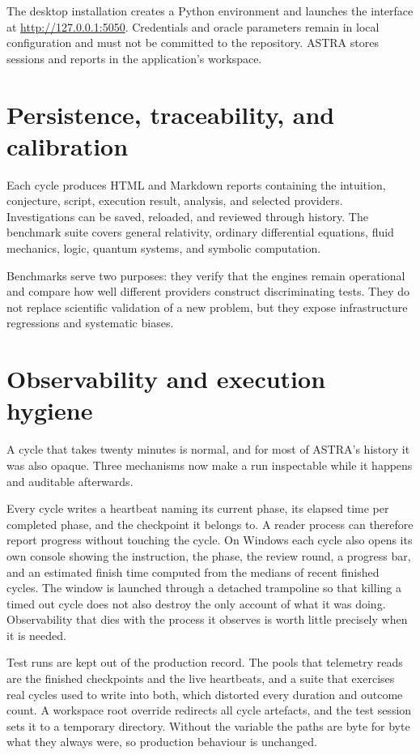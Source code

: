 \documentclass[11pt,a4paper]{article}
\begin{document}
The desktop installation creates a Python environment and launches the interface at \url{http://127.0.0.1:5050}. Credentials and oracle parameters remain in local configuration and must not be committed to the repository. ASTRA stores sessions and reports in the application's workspace.

\section{Persistence, traceability, and calibration}

Each cycle produces HTML and Markdown reports containing the intuition, conjecture, script, execution result, analysis, and selected providers. Investigations can be saved, reloaded, and reviewed through history. The benchmark suite covers general relativity, ordinary differential equations, fluid mechanics, logic, quantum systems, and symbolic computation.

Benchmarks serve two purposes: they verify that the engines remain operational and compare how well different providers construct discriminating tests. They do not replace scientific validation of a new problem, but they expose infrastructure regressions and systematic biases.

\section{Observability and execution hygiene}

A cycle that takes twenty minutes is normal, and for most of ASTRA's history it was also opaque. Three mechanisms now make a run inspectable while it happens and auditable afterwards.

Every cycle writes a heartbeat naming its current phase, its elapsed time per completed phase, and the checkpoint it belongs to. A reader process can therefore report progress without touching the cycle. On Windows each cycle also opens its own console showing the instruction, the phase, the review round, a progress bar, and an estimated finish time computed from the medians of recent finished cycles. The window is launched through a detached trampoline so that killing a timed out cycle does not also destroy the only account of what it was doing. Observability that dies with the process it observes is worth little precisely when it is needed.

Test runs are kept out of the production record. The pools that telemetry reads are the finished checkpoints and the live heartbeats, and a suite that exercises real cycles used to write into both, which distorted every duration and outcome count. A workspace root override redirects all cycle artefacts, and the test session sets it to a temporary directory. Without the variable the paths are byte for byte what they always were, so production behaviour is unchanged.
\end{document}
